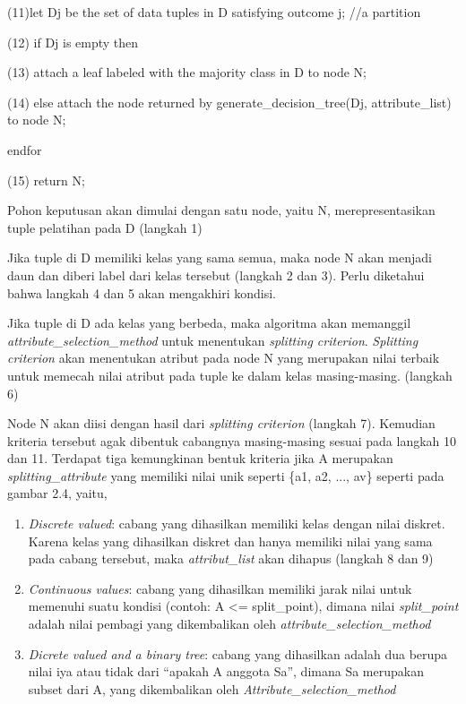 (11)let D\lowercase{j} be the set of data tuples in D satisfying outcome j; //a partition

(12) if D\lowercase{j} is empty then

(13) attach a leaf labeled with the majority class in D to node N;

(14) else attach the node returned by generate\_decision\_tree(D\lowercase{j}, attribute\_list) to node N;

endfor

(15) return N;

Pohon keputusan akan dimulai dengan satu node, yaitu N, merepresentasikan tuple pelatihan pada D (langkah 1)

Jika tuple di D memiliki kelas yang sama semua, maka node N akan menjadi daun dan diberi label dari kelas tersebut (langkah 2 dan 3). Perlu diketahui bahwa langkah 4 dan 5 akan mengakhiri kondisi.

Jika tuple di D ada kelas yang berbeda, maka algoritma akan memanggil \textsl{attribute\_selection\_method} untuk menentukan \textsl{splitting criterion}. \textsl{Splitting criterion} akan menentukan atribut pada node N yang merupakan nilai terbaik untuk memecah nilai atribut pada tuple ke dalam kelas masing-masing. (langkah 6)

Node N akan diisi dengan hasil dari \textsl{splitting criterion} (langkah 7). Kemudian kriteria tersebut agak dibentuk cabangnya masing-masing sesuai pada langkah 10 dan 11. Terdapat tiga kemungkinan bentuk kriteria jika A merupakan \textsl{splitting\_attribute} yang memiliki nilai unik seperti \{a1, a2, ..., av\} seperti pada gambar 2.4, yaitu,

\begin{enumerate}
	\item \textsl{Discrete valued}: cabang yang dihasilkan memiliki kelas dengan nilai diskret. Karena kelas yang dihasilkan diskret dan hanya memiliki nilai yang sama pada cabang tersebut, maka \textsl{attribut\_list} akan dihapus (langkah 8 dan 9)
	\item \textsl{Continuous values}: cabang yang dihasilkan memiliki jarak nilai untuk memenuhi suatu kondisi (contoh: A <= split\_point), dimana nilai \textsl{split\_point} adalah nilai pembagi yang dikembalikan oleh \textsl{attribute\_selection\_method}
	\item \textsl{Dicrete valued and a binary tree}: cabang yang dihasilkan adalah dua berupa nilai iya atau tidak dari "`apakah A anggota Sa"', dimana Sa merupakan subset dari A, yang dikembalikan oleh \textsl{Attribute\_selection\_method}
\end{enumerate}


